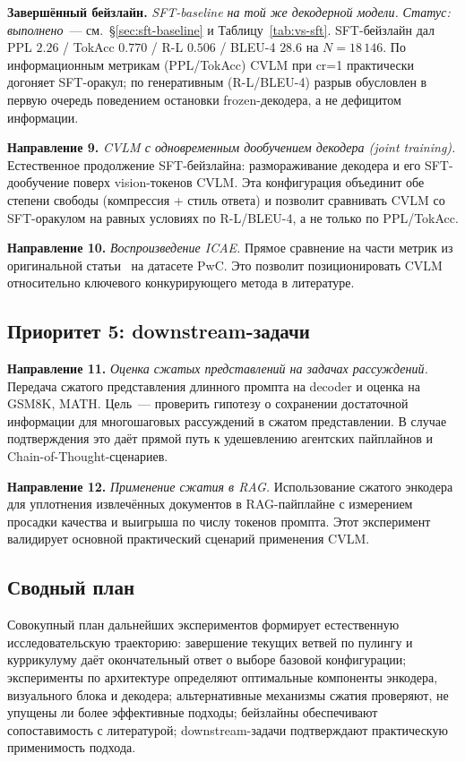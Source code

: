 \documentclass[a4paper,12pt]{extarticle}
\begin{document}
\textbf{Завершённый бейзлайн.} \emph{SFT-baseline на той же декодерной модели.}
\emph{Статус: выполнено}~--- см.~§\ref{sec:sft-baseline} и Таблицу~\ref{tab:vs-sft}. SFT-бейзлайн дал PPL $2.26$ / TokAcc $0.770$ / R-L $0.506$ / BLEU-4 $28.6$ на $N = 18\,146$. По информационным метрикам (PPL/TokAcc) CVLM при cr=1 практически догоняет SFT-оракул; по генеративным (R-L/BLEU-4) разрыв обусловлен в первую очередь поведением остановки frozen-декодера, а не дефицитом информации.

\textbf{Направление 9.} \emph{CVLM с одновременным дообучением декодера (joint training).}
Естественное продолжение SFT-бейзлайна: размораживание декодера и его SFT-дообучение поверх vision-токенов CVLM. Эта конфигурация объединит обе степени свободы (компрессия + стиль ответа) и позволит сравнивать CVLM со SFT-оракулом на равных условиях по R-L/BLEU-4, а не только по PPL/TokAcc.

\textbf{Направление 10.} \emph{Воспроизведение ICAE.}
Прямое сравнение на части метрик из оригинальной статьи~\cite{icae} на датасете PwC. Это позволит позиционировать CVLM относительно ключевого конкурирующего метода в литературе.

\subsection{Приоритет 5: downstream-задачи}

\textbf{Направление 11.} \emph{Оценка сжатых представлений на задачах рассуждений.}
Передача сжатого представления длинного промпта на decoder и оценка на GSM8K, MATH. Цель~--- проверить гипотезу о сохранении достаточной информации для многошаговых рассуждений в сжатом представлении. В случае подтверждения это даёт прямой путь к удешевлению агентских пайплайнов и Chain-of-Thought-сценариев.

\textbf{Направление 12.} \emph{Применение сжатия в RAG.}
Использование сжатого энкодера для уплотнения извлечённых документов в RAG-пайплайне с измерением просадки качества и выигрыша по числу токенов промпта. Этот эксперимент валидирует основной практический сценарий применения CVLM.

\subsection{Сводный план}

Совокупный план дальнейших экспериментов формирует естественную исследовательскую траекторию: завершение текущих ветвей по пулингу и куррикулуму даёт окончательный ответ о выборе базовой конфигурации; эксперименты по архитектуре определяют оптимальные компоненты энкодера, визуального блока и декодера; альтернативные механизмы сжатия проверяют, не упущены ли более эффективные подходы; бейзлайны обеспечивают сопоставимость с литературой; downstream-задачи подтверждают практическую применимость подхода.


	
\newpage 
\printbibliography[heading=bibintoc] 

\newpage
\appendix
\end{document}
